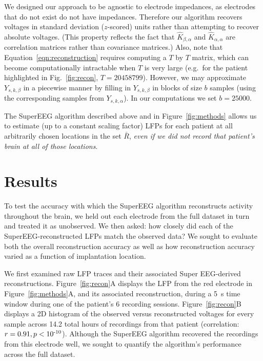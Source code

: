 \documentclass[11pt]{article}
\begin{document}
We designed our approach to be agnostic to electrode impedances, as
electrodes that do not exist do not have impedances.  Therefore our
algorithm recovers voltages in standard deviation ($z$-scored) units
rather than attempting to recover absolute voltages. (This property
reflects the fact that $\hat{K}_{\beta, \alpha}$ and
$\hat{K}_{\alpha, \alpha}$ are correlation matrices rather than
covariance matrices.)  Also, note that
Equation~\ref{eqn:reconstruction} requires computing a $T$ by $T$
matrix, which can become computationally intractable when $T$ is very
large (e.g.\ for the patient highlighted in Fig.~\ref{fig:recon}, $T = 20458799$). However, we may approximate $Y_{s,k,\beta}$ in a piecewise
manner by filling in $Y_{s,k,\beta}$ in blocks of size $b$ samples
(using the corresponding samples from $Y_{s, k, \alpha}$).  In our
computations we set $b = 25000$.

The SuperEEG algorithm described above and in
Figure~\ref{fig:methods} allows us to estimate (up to a constant
scaling factor) LFPs for each patient at all arbitrarily chosen
locations in the set $\bar{R}$, \textit{even if we did not record that
  patient's brain at all of those locations}.

\section*{Results}
To test the accuracy with which the SuperEEG algorithm reconstructs activity throughout the brain, we held out each electrode from the full
dataset in turn and treated it as unobserved. We then asked: how
closely did each of the SuperEEG-reconstructed LFPs match the
observed data?  We sought to evaluate both the overall reconstruction
accuracy as well as how reconstruction accuracy varied as a function
of implantation location.

We first examined raw LFP traces and their associated Super
EEG-derived reconstructions.  Figure~\ref{fig:recon}A displays the
LFP from the red electrode in Figure~\ref{fig:methods}A, and its
associated reconstruction, during a 5~s time window during one of the
patient's 6 recording sessions.  Figure~\ref{fig:recon}B displays a 2D
histogram of the observed versus reconstructed voltages for every
sample across 14.2 total hours of recordings from that patient (correlation:
$r = 0.91, p < 10\textsuperscript{-10}$).  Although the SuperEEG
algorithm recovered the recordings from this electrode well, we sought to
quantify the algorithm's performance across the full dataset.
\end{document}
